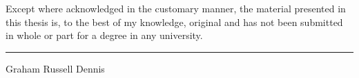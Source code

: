 \documentclass[twoside,onecolumn,11pt,a4paper,draft]{book}
\begin{document}

Except where acknowledged in the customary manner, the material 
presented in this thesis is, to the best of my knowledge, original and 
has not been submitted in whole or part for a degree in any 
university.

\vspace{20mm}  %

\hspace{80mm}\rule{40mm}{.15mm}\par   %
\hspace{80mm} Graham Russell Dennis\par





\tableofcontents
\cleardoublepage

\setcounter{page}{1}  %

%

%








%
\appendix






\end{document}
